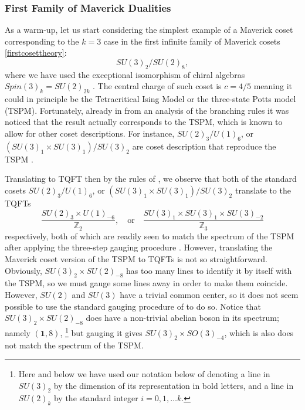 \documentclass[11pt]{article}
\numberwithin{equation}{section}
\begin{document}
\subsubsection*{First Family of Maverick Dualities}

As a warm-up, let us start considering the simplest example of a Maverick coset corresponding to the $k=3$ case in the first infinite family of Maverick cosets \eqref{firstcosettheory}:
\begin{equation}\label{oneof3}
    SU(3)_{2}/SU(2)_{8},
\end{equation}
where we have used the exceptional isomorphism of chiral algebras $Spin(3)_{k} = SU(2)_{2k}$ \cite{Aharony:2016jvv}. The central charge of such coset is $c=4/5$ meaning it could in principle be the Tetracritical Ising Model or the three-state Potts model (TSPM). Fortunately, already in \cite{Dunbar:1992gh,Dunbar:1993hr} from an analysis of the branching rules it was noticed that the result actually corresponds to the TSPM, which is known to allow for other coset descriptions. For instance, $SU(2)_{3}/U(1)_{6}$, or $(SU(3)_{1} \times SU(3)_{1})/SU(3)_{2}$ are coset description that reproduce the TSPM \cite{DiFrancesco:1997nk}.

Translating to TQFT then by the rules of \cite{Moore:1989yh}, we observe that both of the standard cosets $SU(2)_{3}/U(1)_{6}$, or $(SU(3)_{1} \times SU(3)_{1})/SU(3)_{2}$ translate to the TQFTs 
\begin{equation}\label{2and3of3}
    \frac{SU(2)_{3} \times U(1)_{-6}}{\mathbb{Z}_{2}}, \quad \mathrm{or} \quad \frac{SU(3)_{1} \times SU(3)_{1} \times SU(3)_{-2}}{\mathbb{Z}_{3}}
\end{equation}
respectively, both of which are readily seen to match the spectrum of the TSPM after applying the three-step gauging procedure \cite{Moore:1989yh}. However, translating the Maverick coset version of the TSPM to TQFTs is not so straightforward. Obviously, $SU(3)_{2} \times SU(2)_{-8}$ has too many lines to identify it by itself with the TSPM, so we must gauge some lines away in order to make them coincide. However, $SU(2)$ and $SU(3)$ have a trivial common center, so it does not seem possible to use the standard gauging procedure of \cite{Moore:1989yh} to do so. Notice that $SU(3)_{2} \times SU(2)_{-8}$ does have a non-trivial abelian boson in its spectrum; namely $(\mathbf{1},8)$, \footnote{Here and below we have used our notation below of denoting a line in $SU(3)_{2}$ by the dimension of its representation in bold letters, and a line in $SU(2)_{k}$ by the standard integer $i=0,1,\ldots k$.} but gauging it gives $SU(3)_{2} \times SO(3)_{-4}$, which is also does not match the spectrum of the TSPM.
\end{document}
